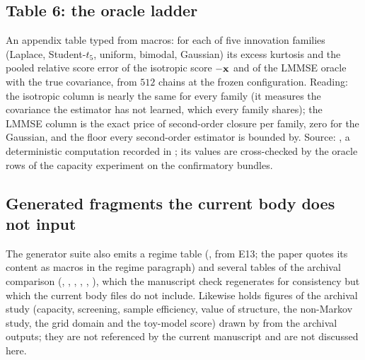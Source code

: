 \subsection{Table 6: the oracle ladder}

An appendix table typed from macros: for each of five innovation families (Laplace,
Student-$t_5$, uniform, bimodal, Gaussian) its excess kurtosis and the pooled relative
score error of the isotropic score $-\mathbf{x}$ and of the LMMSE oracle with the true
covariance, from $512$ chains at the frozen configuration. Reading: the isotropic column
is nearly the same for every family (it measures the covariance the estimator has not
learned, which every family shares); the LMMSE column is the exact price of second-order
closure per family, zero for the Gaussian, and the floor every second-order estimator is
bounded by. Source: , a deterministic computation
recorded in ; its values are cross-checked by the
oracle rows of the capacity experiment on the confirmatory bundles.

\subsection{Generated fragments the current body does not input}

The generator suite also emits a regime table (, from E13; the
paper quotes its content as macros in the regime paragraph) and several tables of the
archival comparison (, , ,
, , ), which the manuscript
check regenerates for consistency but which the current body files do not include.
Likewise  holds figures of the archival study (capacity,
screening, sample efficiency, value of structure, the non-Markov study, the grid domain
and the toy-model score) drawn by  from the archival
outputs; they are not referenced by the current manuscript and are not discussed here.


